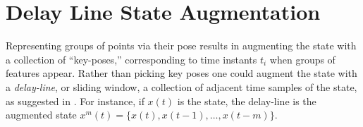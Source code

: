 \documentclass[]{article}
\begin{document}
\section{Delay Line State Augmentation} 



Representing groups of points via their pose results in augmenting the state with a collection of ``key-poses,'' corresponding to time instants $t_i$ when groups of features appear. Rather than picking key poses %
one could augment the state with a {\em delay-line}, or sliding window, a collection of adjacent time samples of the state, as suggested in \cite{mourikisR07}. For instance, if $x(t)$ is the state, the delay-line is the augmented state $x^m(t)  = \{x(t), x(t-1), \dots , x(t-m)\}$. %
\end{document}
